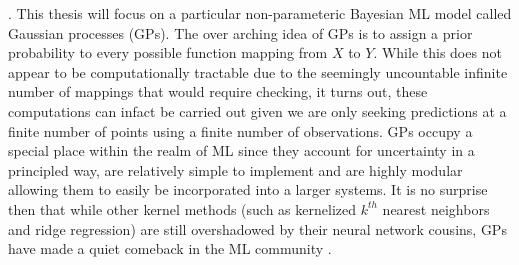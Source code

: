 \cite{RasmussenCarlEdward2006Gpfm}. This thesis will focus on a particular non-parameteric Bayesian ML model called Gaussian processes (GPs). The over arching idea of GPs is to assign a prior probability to every possible function mapping from $X$ to $Y$. While this does not appear to be computationally tractable due to the seemingly uncountable infinite number of mappings that would require checking, it turns out, these computations can infact be carried out given we are only seeking predictions at a finite number of points using a finite number of observations. GPs occupy a special place within the realm of ML since they account for uncertainty in a principled way, are relatively simple to implement and are highly modular allowing them to easily be incorporated into a larger systems. It is no surprise then that while other kernel methods (such as kernelized $k^{th}$ nearest neighbors and ridge regression) are still overshadowed by their neural network cousins, GPs have made a quiet comeback in the ML community \cite{cao2018scaling}.

